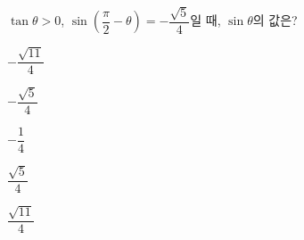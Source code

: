 $\tan\theta>0$, $\sin\left(\dfrac{\pi}{2}-\theta\right)=-\dfrac{\sqrt{5}}{4}$일 때, $\sin\theta$의 값은?
\begin{choices32}{\rule[-3ex]{0pt}{8ex}$-\dfrac{\sqrt{11}}{4}$}{\rule[-3ex]{0pt}{8ex}$-\dfrac{\sqrt{5}}{4}$}{\rule[-3ex]{0pt}{8ex}$-\dfrac{1}{4}$}{\rule[-3ex]{0pt}{8ex}$\dfrac{\sqrt{5}}{4}$}{\rule[-3ex]{0pt}{8ex}$\dfrac{\sqrt{11}}{4}$}\end{choices32}
